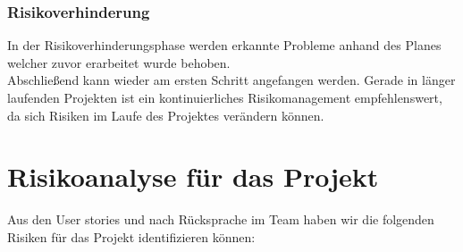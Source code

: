 \subsubsection{Risikoverhinderung}
In der Risikoverhinderungsphase werden erkannte Probleme anhand des Planes welcher zuvor erarbeitet wurde behoben.
\\
Abschließend kann wieder am ersten Schritt angefangen werden. Gerade in länger laufenden Projekten ist ein kontinuierliches Risikomanagement empfehlenswert, da sich Risiken im Laufe des Projektes verändern können.

\section{Risikoanalyse für das Projekt}
Aus den User stories und nach Rücksprache im Team haben wir die folgenden Risiken für das Projekt identifizieren können:

